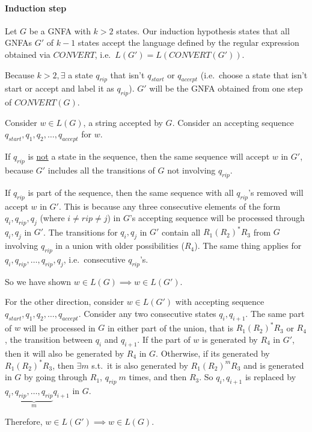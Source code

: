 \documentclass[12 pt]{article}
\begin{document}
\paragraph{Induction step} Let $G$ be a GNFA with $k > 2$ states. Our
induction hypothesis states that all GNFAs $G'$ of $k-1$ states accept
the language defined by the regular expression obtained via $CONVERT$,
i.e.\ $L(G')=L(CONVERT(G'))$.

Because $k > 2, \exists$ a state $q_{rip}$ that isn't $q_{start}$ or
$q_{accept}$ (i.e.\ choose a state that isn't start or accept and
label it as $q_{rip}$). $G'$ will be the GNFA obtained from one step
of $CONVERT(G)$.

Consider $w\in L(G)$, a string accepted by $G$. Consider an accepting
sequence $q_{start}, q_1, q_2, \ldots, q_{accept}$ for $w$.

If $q_{rip}$ is \underline{not} a state in the sequence, then the same
sequence will accept $w$ in $G'$, because $G'$ includes all the
transitions of $G$ not involving $q_{rip}$.

If $q_{rip}$ is part of the sequence, then the same sequence with all
$q_{rip}$'s removed will accept $w$ in $G'$. This is because any three
consecutive elements of the form $q_i, q_{rip}, q_{j}$ (where $i \neq
rip \neq j$) in $G$'s accepting sequence will be processed through
$q_{i}, q_j$ in $G'$. The transitions for $q_i, q_j$ in $G'$ contain
all $R_1(R_2)^*R_3$ from $G$ involving $q_{rip}$ in a union with older
possibilities ($R_4$). The same thing applies for $q_{i}, q_{rip},
\ldots, q_{rip}, q_{j}$, i.e.\ consecutive $q_{rip}$'s.

So we have shown $w \in L(G) \implies w \in L(G')$.

For the other direction, consider $w \in L(G')$ with accepting
sequence $q_{start},q_{1},q_2, \ldots, q_{accept}$. Consider any two
consecutive states $q_i, q_{i+1}$. The same part of $w$ will be
processed in $G$ in either part of the union, that is $R_1(R_2)^*R_3$
or $R_4$, the transition between $q_i$ and $q_{i+1}$. If the part of
$w$ is generated by $R_4$ in $G'$, then it will also be generated by
$R_4$ in $G$. Otherwise, if its generated by $R_1(R_2)^*R_3$, then
$\exists m$ s.t.\ it is also generated by $R_1(R_2)^mR_3$ and is
generated in $G$ by going through $R_1$, $q_{rip}\ m$ times, and then
$R_3$. So $q_{i}, q_{i+1}$ is replaced by $q_{i}, \underbrace{q_{rip},
  \ldots, q_{rip}}_{m} q_{i+1}$ in $G$.

Therefore, $w \in L(G') \implies w \in L(G)$.
\end{document}
